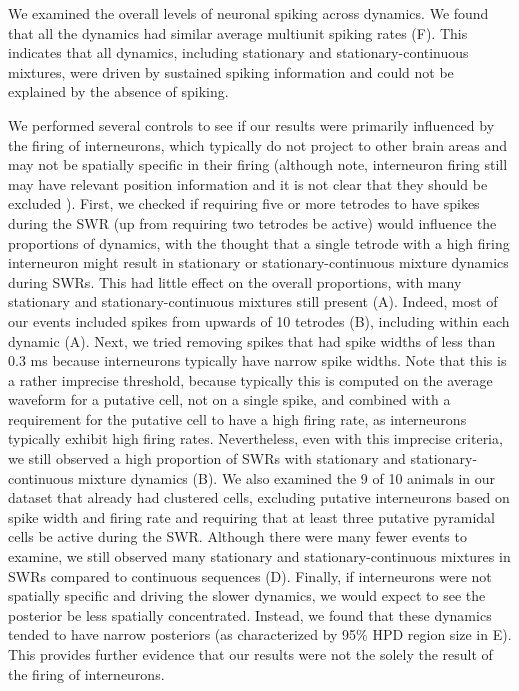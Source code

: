 \documentclass[9pt,lineno]{elife}
\begin{document}
We examined the overall levels of neuronal spiking across dynamics. We found that all the dynamics had similar average multiunit spiking rates (F). This indicates that all dynamics, including stationary and stationary-continuous mixtures, were driven by sustained spiking information and could not be explained by the absence of spiking.

We performed several controls to see if our results were primarily influenced by the firing of interneurons, which typically do not project to other brain areas and may not be spatially specific in their firing (although note, interneuron firing still may have relevant position information and it is not clear that they should be excluded \citep{HangyaComplementaryspatialfiring2010, WilentDiscretePlaceFields2007}). First, we checked if requiring five or more tetrodes to have spikes during the SWR (up from requiring two tetrodes be active) would influence the proportions of dynamics, with the thought that a single tetrode with a high firing interneuron might result in stationary or stationary-continuous mixture dynamics during SWRs. This had little effect on the overall proportions, with many stationary and stationary-continuous mixtures still present (A). Indeed, most of our events included spikes from upwards of 10 tetrodes (B), including within each dynamic (A). Next, we tried removing spikes that had spike widths of less than 0.3 ms because interneurons typically have narrow spike widths. Note that this is a rather imprecise threshold, because typically this is computed on the average waveform for a putative cell, not on a single spike, and combined with a requirement for the putative cell to have a high firing rate, as interneurons typically exhibit high firing rates. Nevertheless, even with this imprecise criteria, we still observed a high proportion of SWRs with stationary and stationary-continuous mixture dynamics (B). We also examined the 9 of 10 animals in our dataset that already had clustered cells, excluding putative interneurons based on spike width and firing rate and requiring that at least three putative pyramidal cells be active during the SWR. Although there were many fewer events to examine, we still observed many stationary and stationary-continuous mixtures in SWRs compared to continuous sequences (D). Finally,  if interneurons were not spatially specific and driving the slower dynamics, we would expect to see the posterior be less spatially concentrated. Instead, we found that these dynamics tended to have narrow posteriors (as characterized by 95\% HPD region size in E). This provides further evidence that our results were not the solely the result of the firing of interneurons. 
\end{document}
